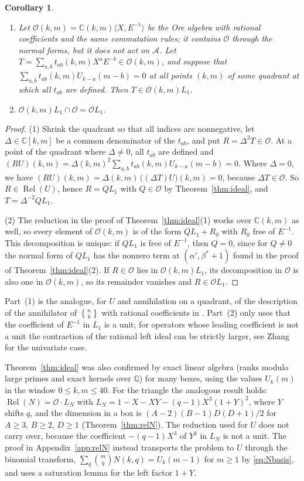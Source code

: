 \documentclass[11pt]{amsart}
\newtheorem{corollary}[theorem]{Corollary}
\theoremstyle{definition}
\newcommand{\stirling}[2]{\genfrac{\{}{\}}{0pt}{}{#1}{#2}}
\newcommand{\C}{\mathbb{C}}
\newcommand{\Q}{\mathbb{Q}}
\newcommand{\cO}{\mathcal{O}}
\DeclareMathOperator{\Rel}{Rel}
\begin{document}
\begin{corollary}\label{cor:saturated}\leavevmode
\begin{enumerate}
\item Let $\cO(k,m)=\C(k,m)\langle X,E^{-1}\rangle$ be the Ore algebra with rational coefficients and the same commutation rules; it contains $\cO$ through the normal forms, but it does not act on $\mathcal A$. Let $T=\sum_{a,b}t_{ab}(k,m)X^aE^{-b}\in\cO(k,m)$, and suppose that $\sum_{a,b}t_{ab}(k,m)U_{k-a}(m-b)=0$ at all points $(k,m)$ of some quadrant at which all $t_{ab}$ are defined. Then $T\in\cO(k,m)L_1$.
\item $\cO(k,m)L_1\cap\cO=\cO L_1$.
\end{enumerate}
\end{corollary}

\begin{proof}
(1) Shrink the quadrant so that all indices are nonnegative, let $\Delta\in\C[k,m]$ be a common denominator of the $t_{ab}$, and put $R=\Delta^2T\in\cO$. At a point of the quadrant where $\Delta\ne0$, all $t_{ab}$ are defined and $(RU)(k,m)=\Delta(k,m)^2\sum_{a,b}t_{ab}(k,m)U_{k-a}(m-b)=0$. Where $\Delta=0$, we have $(RU)(k,m)=\Delta(k,m)\,\bigl((\Delta T)U\bigr)(k,m)=0$, because $\Delta T\in\cO$. So $R\in\Rel(U)$, hence $R=QL_1$ with $Q\in\cO$ by Theorem~\ref{thm:ideal}, and $T=\Delta^{-2}QL_1$.

(2) The reduction in the proof of Theorem~\ref{thm:ideal}(1) works over $\C(k,m)$ as well, so every element of $\cO(k,m)$ is of the form $QL_1+R_0$ with $R_0$ free of $E^{-1}$. This decomposition is unique: if $QL_1$ is free of $E^{-1}$, then $Q=0$, since for $Q\ne0$ the normal form of $QL_1$ has the nonzero term at $(\alpha',\beta^*+1)$ found in the proof of Theorem~\ref{thm:ideal}(2). If $R\in\cO$ lies in $\cO(k,m)L_1$, its decomposition in $\cO$ is also one in $\cO(k,m)$, so its remainder vanishes and $R\in\cO L_1$.
\end{proof}

Part~(1) is the analogue, for $U$ and annihilation on a quadrant, of the description of the annihilator of $\stirling{n}{k}$ with rational coefficients in \cite[Example~5]{Kauers07}. Part~(2) only uses that the coefficient of $E^{-1}$ in $L_1$ is a unit; for operators whose leading coefficient is not a unit the contraction of the rational left ideal can be strictly larger, see Zhang \cite{Zhang} for the univariate case.

Theorem~\ref{thm:ideal} was also confirmed by exact linear algebra (ranks modulo large primes and exact kernels over $\Q$) for many boxes, using the values $U_k(m)$ in the window $0\le k,m\le40$. For the triangle the analogous result holds: $\Rel(N)=\cO\cdot L_N$ with $L_N=1-X-XY-(q-1)X^3(1+Y)^2$, where $Y$ shifts $q$, and the dimension in a box is $(A-2)(B-1)D(D+1)/2$ for $A\ge3$, $B\ge2$, $D\ge1$ (Theorem~\ref{thm:relN}). The reduction used for $U$ does not carry over, because the coefficient $-(q-1)X^3$ of $Y^2$ in $L_N$ is not a unit. The proof in Appendix~\ref{app:relN} instead transports the problem to $U$ through the binomial transform, $\sum_q\binom{m}{q}N(k,q)=U_k(m-1)$ for $m\ge1$ by \eqref{eq:Nbasis}, and uses a saturation lemma for the left factor $1+Y$.
\end{document}
